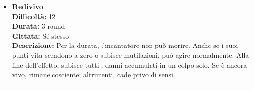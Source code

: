 \documentclass[../manuale_main.tex]{subfiles}
\begin{document}
\begin{itemize}
\item \textbf{Redivivo} \\
\textbf{Difficoltà:} 12 \\
\textbf{Durata:} 3 round \\
\textbf{Gittata:} Sé stesso \\
\textbf{Descrizione:} Per la durata, l’incantatore non può morire. Anche se i suoi punti vita scendono a zero o subisce mutilazioni, può agire normalmente. Alla fine dell’effetto, subisce tutti i danni accumulati in un colpo solo. Se è ancora vivo, rimane cosciente; altrimenti, cade privo di sensi.

\vspace{0.5cm}\rule{\textwidth}{0.4pt}\vspace{1cm}

\end{itemize}
\end{document}
